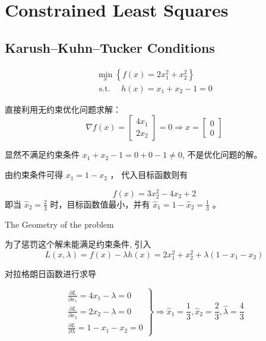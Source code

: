 \chapter{Constrained Least Squares}

\section{Karush–Kuhn–Tucker Conditions}

\begin{problem}
    $$
\begin{array}{l}
\min _{x}\left\{f(x)=2 x_{1}^{2}+x_{2}^{2}\right\} \\
\text { s.t. } \quad h(x)=x_{1}+x_{2}-1=0
\end{array}
$$

直接利用无约束优化问题求解： 
$$ \nabla f(x)=\left[\begin{array}{l}4 x_{1} \\ 2 x_{2}\end{array}\right]=0 \Rightarrow x=\left[\begin{array}{l}0 \\ 0\end{array}\right] $$

显然不满足约束条件 $ x_{1}+x_{2}-1=0+0-1 \neq 0 $, 不是优化问题的解。
\end{problem}

由约束条件可得 $ x_{1}=1-x_{2} $ ， 代入目标函数则有

$$ f(x)=3 x_{2}^{2}-4 x_{2}+2 $$
即当 $ \hat{x}_{2}=\frac{2}{3} $ 时，目标函数值最小，并有 $ \hat{x}_{1}=1-\hat{x}_{2}=\frac{1}{3} $ 。

\begin{FigureCenter}{The Geometry of the problem}
    \label{fig:geometry-of-the-problem}
    
\end{FigureCenter}

为了惩罚这个解未能满足约束条件, 引入
$$
L(x, \lambda)=f(x)-\lambda h(x)=2 x_{1}^{2}+x_{2}^{2}+\lambda\left(1-x_{1}-x_{2}\right)
$$

对拉格朗日函数进行求导

$$ \left.\begin{array}{l}\frac{\partial L}{\partial x_{1}}=4 x_{1}-\lambda=0 \\ \frac{\partial L}{\partial x_{2}}=2 x_{2}-\lambda=0 \\ \frac{\partial L}{\partial \lambda}=1-x_{1}-x_{2}=0\end{array}\right \} \Rightarrow \hat{x}_{1}=\frac{1}{3}, \hat{x}_{2}=\frac{2}{3}, \hat{\lambda}=\frac{4}{3} $$

